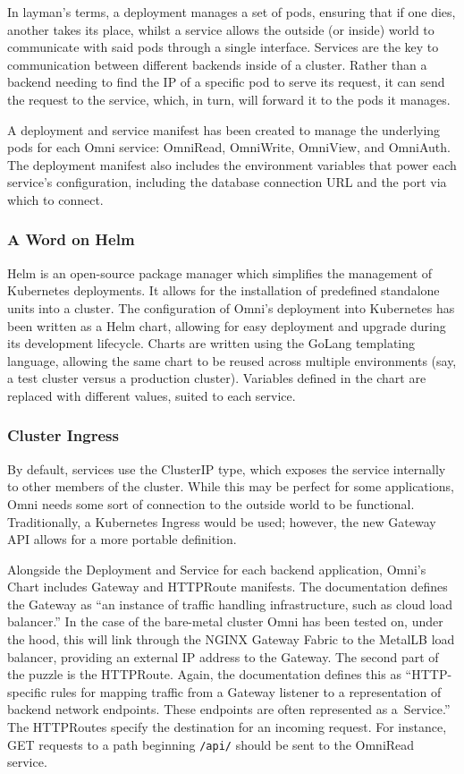 In layman's terms, a deployment manages a set of pods, ensuring that if one dies, another takes its place, whilst a service allows the outside (or inside) world to communicate with said pods through a single interface.
Services are the key to communication between different backends inside of a cluster.
Rather than a backend needing to find the IP of a specific pod to serve its request, it can send the request to the service, which, in turn, will forward it to the pods it manages. 

A deployment and service manifest has been created to manage the underlying pods for each Omni service: OmniRead, OmniWrite, OmniView, and OmniAuth.
The deployment manifest also includes the environment variables that power each service's configuration, including the database connection URL and the port via which to connect.

\subsubsection{A Word on Helm}
Helm is an open-source package manager which simplifies the management of Kubernetes deployments. It allows for the installation of predefined standalone units into a cluster. 
The configuration of Omni's deployment into Kubernetes has been written as a Helm chart, allowing for easy deployment and upgrade during its development lifecycle. 
Charts are written using the GoLang templating language, allowing the same chart to be reused across multiple environments (say, a test cluster versus a production cluster).
Variables defined in the chart are replaced with different values, suited to each service.

\subsubsection{Cluster Ingress}
By default, services use the ClusterIP type, which exposes the service internally to other members of the cluster.
While this may be perfect for some applications, Omni needs some sort of connection to the outside world to be functional.
Traditionally, a Kubernetes Ingress would be used; however, the new Gateway API allows for a more portable definition. 

Alongside the Deployment and Service for each backend application, Omni's Chart includes Gateway and HTTPRoute manifests.
The documentation defines the Gateway as ``an instance of traffic handling infrastructure, such as cloud load balancer.''
In the case of the bare-metal cluster Omni has been tested on, under the hood, this will link through the NGINX Gateway Fabric to the MetalLB load balancer, providing an external IP address to the Gateway. 
The second part of the puzzle is the HTTPRoute. Again, the documentation defines this as ``HTTP-specific rules for mapping traffic from a Gateway listener to a representation of backend network endpoints. These endpoints are often represented as a Service.''
The HTTPRoutes specify the destination for an incoming request. 
For instance, GET requests to a path beginning \verb|/api/| should be sent to the OmniRead service. 

